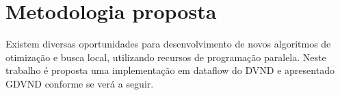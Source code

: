 \chapter{Metodologia proposta}\label{cap:metodologia}

Existem diversas oportunidades para desenvolvimento de novos algoritmos de otimização e busca local, utilizando recursos de programação paralela.
Neste trabalho é proposta uma implementação em dataflow do DVND e apresentado GDVND conforme se verá a seguir.

% 









